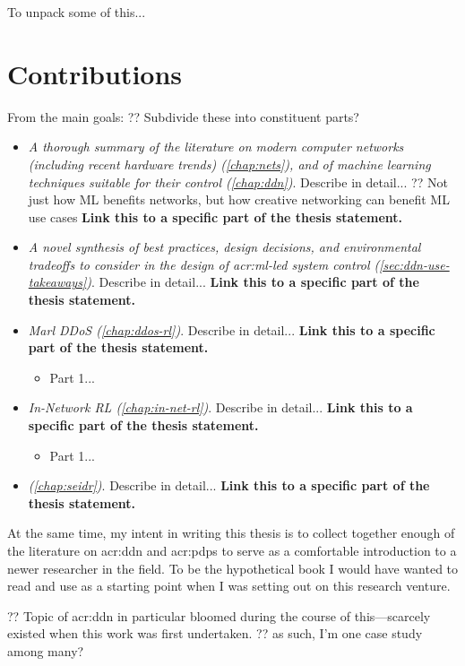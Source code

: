 To unpack some of this...

\section{Contributions}
From the main goals: ?? Subdivide these into constituent parts?
\begin{itemize}
	\item \emph{A thorough summary of the literature on modern computer networks (including recent hardware trends) (\cref{chap:nets}), and of machine learning techniques suitable for their control (\cref{chap:ddn})}. Describe in detail... ?? Not just how ML benefits networks, but how creative networking can benefit ML use cases \textbf{Link this to a specific part of the thesis statement.}
	\item \emph{A novel synthesis of best practices, design decisions, and environmental tradeoffs to consider in the design of \gls{acr:ml}-led system control (\cref{sec:ddn-use-takeaways})}. Describe in detail... \textbf{Link this to a specific part of the thesis statement.}
	\item \emph{Marl DDoS (\cref{chap:ddos-rl})}. Describe in detail... \textbf{Link this to a specific part of the thesis statement.}
	\begin{itemize}
		\item Part 1...
	\end{itemize}
	\item \emph{In-Network RL (\cref{chap:in-net-rl})}. Describe in detail... \textbf{Link this to a specific part of the thesis statement.}
	\begin{itemize}
		\item Part 1...
	\end{itemize}
	\item \emph{\seidr{} (\cref{chap:seidr})}. Describe in detail... \textbf{Link this to a specific part of the thesis statement.}
\end{itemize}

At the same time, my intent in writing this thesis is to collect together enough of the literature on \gls{acr:ddn} and \glspl{acr:pdp} to serve as a comfortable introduction to a newer researcher in the field.
To be the hypothetical book I would have wanted to read and use as a starting point when I was setting out on this research venture.

?? Topic of \gls{acr:ddn} in particular bloomed during the course of this---scarcely existed when this work was first undertaken.
?? as such, I'm one case study among many?


